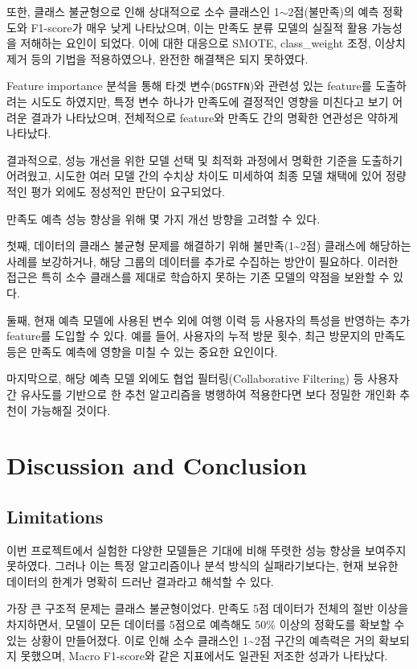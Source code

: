 \documentclass[sigconf]{acmart}
\begin{document}
\begin{CJK}{UTF8}{mj}
또한, 클래스 불균형으로 인해 상대적으로 소수 클래스인 1$\sim$2점(불만족)의 예측 정확도와 F1-score가 매우 낮게 나타났으며, 이는 만족도 분류 모델의 실질적 활용 가능성을 저해하는 요인이 되었다.  
이에 대한 대응으로 SMOTE, class\_weight 조정, 이상치 제거 등의 기법을 적용하였으나, 완전한 해결책은 되지 못하였다.

Feature importance 분석을 통해 타겟 변수(\texttt{DGSTFN})와 관련성 있는 feature를 도출하려는 시도도 하였지만, 특정 변수 하나가 만족도에 결정적인 영향을 미친다고 보기 어려운 결과가 나타났으며, 전체적으로 feature와 만족도 간의 명확한 연관성은 약하게 나타났다.

결과적으로, 성능 개선을 위한 모델 선택 및 최적화 과정에서 명확한 기준을 도출하기 어려웠고, 시도한 여러 모델 간의 수치상 차이도 미세하여 최종 모델 채택에 있어 정량적인 평가 외에도 정성적인 판단이 요구되었다.

만족도 예측 성능 향상을 위해 몇 가지 개선 방향을 고려할 수 있다. 

첫째, 데이터의 클래스 불균형 문제를 해결하기 위해 불만족(1\textasciitilde{}2점) 클래스에 해당하는 사례를 보강하거나, 해당 그룹의 데이터를 추가로 수집하는 방안이 필요하다. 이러한 접근은 특히 소수 클래스를 제대로 학습하지 못하는 기존 모델의 약점을 보완할 수 있다. 

둘째, 현재 예측 모델에 사용된 변수 외에 여행 이력 등 사용자의 특성을 반영하는 추가 feature를 도입할 수 있다. 예를 들어, 사용자의 누적 방문 횟수, 최근 방문지의 만족도 등은 만족도 예측에 영향을 미칠 수 있는 중요한 요인이다. 

마지막으로, 해당 예측 모델 외에도 협업 필터링(Collaborative Filtering) 등 사용자 간 유사도를 기반으로 한 추천 알고리즘을 병행하여 적용한다면 보다 정밀한 개인화 추천이 가능해질 것이다.



\section{Discussion and Conclusion}%

\subsection{Limitations}
이번 프로젝트에서 실험한 다양한 모델들은 기대에 비해 뚜렷한 성능 향상을 보여주지 못하였다. 그러나 이는 특정 알고리즘이나 분석 방식의 실패라기보다는, 현재 보유한 데이터의 한계가 명확히 드러난 결과라고 해석할 수 있다.

가장 큰 구조적 문제는 클래스 불균형이었다. 만족도 5점 데이터가 전체의 절반 이상을 차지하면서, 모델이 모든 데이터를 5점으로 예측해도 50\% 이상의 정확도를 확보할 수 있는 상황이 만들어졌다. 이로 인해 소수 클래스인 1\textasciitilde{}2점 구간의 예측력은 거의 확보되지 못했으며, Macro F1-score와 같은 지표에서도 일관된 저조한 성과가 나타났다.


\end{CJK}
\end{document}
